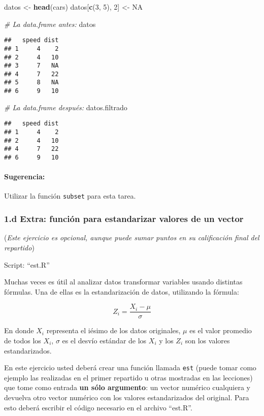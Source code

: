 \documentclass[]{article}
\newenvironment{Shaded}{}{}
\newcommand{\KeywordTok}[1]{\textcolor[rgb]{0.00,0.44,0.13}{\textbf{{#1}}}}
\newcommand{\DecValTok}[1]{\textcolor[rgb]{0.25,0.63,0.44}{{#1}}}
\newcommand{\CommentTok}[1]{\textcolor[rgb]{0.38,0.63,0.69}{\textit{{#1}}}}
\newcommand{\OtherTok}[1]{\textcolor[rgb]{0.00,0.44,0.13}{{#1}}}
\newcommand{\NormalTok}[1]{{#1}}
\begin{document}
\begin{Shaded}
\begin{Highlighting}[]
\NormalTok{datos <- }\KeywordTok{head}\NormalTok{(cars)}
\NormalTok{datos[}\KeywordTok{c}\NormalTok{(}\DecValTok{3}\NormalTok{, }\DecValTok{5}\NormalTok{), }\DecValTok{2}\NormalTok{] <- }\OtherTok{NA}

\CommentTok{# La data.frame antes:}
\NormalTok{datos}
\end{Highlighting}
\end{Shaded}
\begin{verbatim}
##   speed dist
## 1     4    2
## 2     4   10
## 3     7   NA
## 4     7   22
## 5     8   NA
## 6     9   10
\end{verbatim}
\begin{Shaded}
\begin{Highlighting}[]
\CommentTok{# La data.frame después:}
\NormalTok{datos.filtrado}
\end{Highlighting}
\end{Shaded}
\begin{verbatim}
##   speed dist
## 1     4    2
## 2     4   10
## 4     7   22
## 6     9   10
\end{verbatim}
\paragraph{Sugerencia:}

Utilizar la función \texttt{subset} para esta tarea.

\subsubsection{1.d Extra: función para estandarizar valores de un
vector}

(\emph{Este ejercicio es opcional, aunque puede sumar puntos en su
calificación final del repartido})

Script: ``est.R''

Muchas veces es útil al analizar datos transformar variables usando
distintas fórmulas. Una de ellas es la estandarización de datos,
utilizando la fórmula:

\[
  Z_i = \frac{X_i - \mu}{\sigma}
\]

En donde $X_i$ representa el iésimo de los datos originales, $\mu$ es el
valor promedio de todos los $X_i$, $\sigma$ es el desvío estándar de los
$X_i$ y los $Z_i$ son los valores estandarizados.

En este ejercicio usted deberá crear una función llamada \texttt{est}
(puede tomar como ejemplo las realizadas en el primer repartido u otras
mostradas en las lecciones) que tome como entrada \textbf{un sólo
argumento}: un vector numérico cualquiera y devuelva otro vector
numérico con los valores estandarizados del original. Para esto deberá
escribir el código necesario en el archivo ``est.R''.
\end{document}
